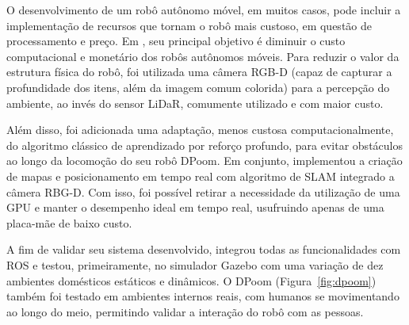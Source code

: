 O desenvolvimento de um robô autônomo móvel, em muitos casos, pode incluir a implementação de recursos que tornam o robô mais custoso, em questão de processamento e preço. Em \citet{dpoom}, seu principal objetivo é diminuir o custo computacional e monetário dos robôs autônomos móveis. Para reduzir o valor da estrutura física do robô, foi utilizada uma câmera RGB-D (capaz de capturar a profundidade dos itens, além da imagem comum colorida) para a percepção do ambiente, ao invés do sensor LiDaR, comumente utilizado e com maior custo. 

Além disso, foi adicionada uma adaptação, menos custosa computacionalmente, do algoritmo clássico de aprendizado por reforço profundo, para evitar obstáculos ao longo da locomoção do seu robô DPoom. Em conjunto, \citet{dpoom} implementou a criação de mapas e posicionamento em tempo real com algoritmo de SLAM integrado a câmera RBG-D. Com isso, foi possível retirar a necessidade da utilização de uma GPU e manter o desempenho ideal em tempo real, usufruindo apenas de uma placa-mãe de baixo custo.

A fim de validar seu sistema desenvolvido, \citet{dpoom} integrou todas as funcionalidades com ROS e testou, primeiramente, no simulador Gazebo com uma variação de dez ambientes domésticos estáticos e dinâmicos. O  DPoom (Figura~\ref{fig:dpoom}) também foi testado em ambientes internos reais, com humanos se movimentando ao longo do meio, permitindo validar a interação do robô com as pessoas.


